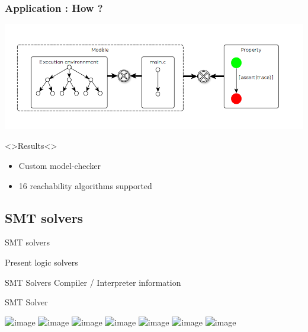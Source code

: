 \documentclass{beamer}
\begin{document}
\begin{frame}
    \frametitle{Application : How ? }

    \includegraphics[width=\textwidth]{Figures/slide_mc.png}

    \begin{block}<>{Results}<>
        \begin{itemize}
            \item Custom model-checker
            \item 16 reachability algorithms supported
        \end{itemize}
    \end{block}

\end{frame}




\subsection{SMT solvers}

\begin{frame}{SMT solvers}

Present logic solvers

\end{frame}

\begin{frame}{SMT Solvers}
Compiler / Interpreter information
\end{frame}

\begin{frame}{SMT Solver}

\includegraphics<1>[width=9cm]{Figures/SMTsolver/1.png}
\includegraphics<2>[width=9cm]{Figures/SMTsolver/2.png}
\includegraphics<3>[width=9cm]{Figures/SMTsolver/3.png}
\includegraphics<4>[width=9cm]{Figures/SMTsolver/4.png}
\includegraphics<5>[width=9cm]{Figures/SMTsolver/5.png}
\includegraphics<6>[width=9cm]{Figures/SMTsolver/6.png}
\includegraphics<7>[width=9cm]{Figures/SMTsolver/7.png}

\end{frame}
\end{document}
